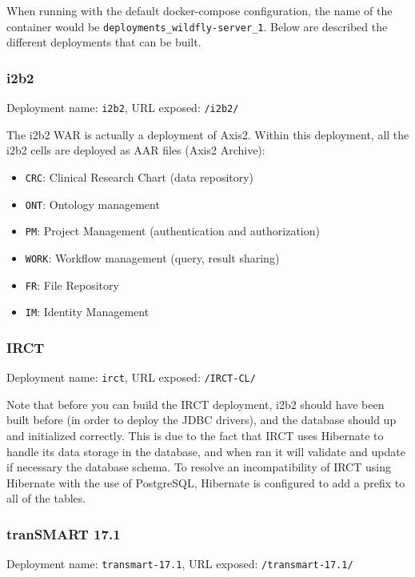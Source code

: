 When running with the default docker-compose configuration, the name of the container would be \verb|deployments_wildfly-server_1|.
Below are described the different deployments that can be built.

\subsubsection{i2b2}
Deployment name: \verb|i2b2|, URL exposed: \verb|/i2b2/|

The i2b2 WAR is actually a deployment of Axis2. Within this deployment, all the i2b2 cells are deployed as AAR files (Axis2 Archive):

\begin{itemize}
    \item \verb|CRC|: Clinical Research Chart (data repository)
    \item \verb|ONT|: Ontology management
    \item \verb|PM|: Project Management (authentication and authorization)
    \item \verb|WORK|: Workflow management (query, result sharing)
    \item \verb|FR|: File Repository
    \item \verb|IM|: Identity Management
\end{itemize}

\subsubsection{IRCT}
Deployment name: \verb|irct|, URL exposed: \verb|/IRCT-CL/|

Note that before you can build the IRCT deployment, i2b2 should have been built before (in order to deploy the JDBC drivers), and the database should up and initialized correctly.
This is due to the fact that IRCT uses Hibernate to handle its data storage in the database, and when ran it will validate and update if necessary the database schema.
To resolve an incompatibility of IRCT using Hibernate with the use of PostgreSQL, Hibernate is configured to add a prefix to all of the tables.

\subsubsection{tranSMART 17.1}
Deployment name: \verb|transmart-17.1|, URL exposed: \verb|/transmart-17.1/|




